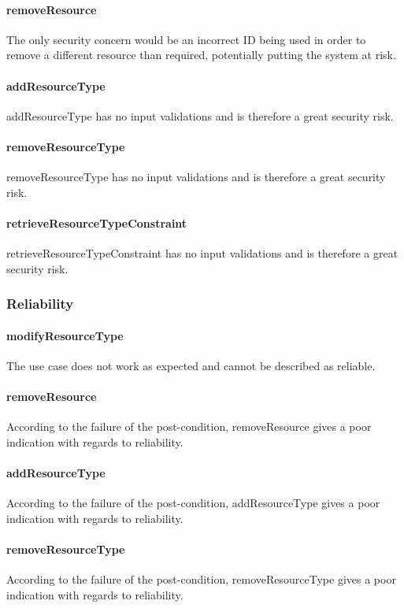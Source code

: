 \documentclass[a4paper]{article}
\begin{document}
\paragraph{removeResource}
The only security concern would be an incorrect ID being used in order to remove a different resource than required, potentially putting the system at risk.

\paragraph{addResourceType}
addResourceType has no input validations and is therefore a great security risk.

\paragraph{removeResourceType}
removeResourceType has no input validations and is therefore a great security risk.

\paragraph{retrieveResourceTypeConstraint}
retrieveResourceTypeConstraint has no input validations and is therefore a great security risk.

\subsubsection {Reliability}

\paragraph{modifyResourceType}
The use case does not work as expected and cannot be described as reliable.

\paragraph{removeResource}
According to the failure of the post-condition, removeResource gives a poor indication with regards to reliability.

\paragraph{addResourceType}
According to the failure of the post-condition, addResourceType gives a poor indication with regards to reliability.

\paragraph{removeResourceType}
According to the failure of the post-condition, removeResourceType gives a poor indication with regards to reliability.
\end{document}
